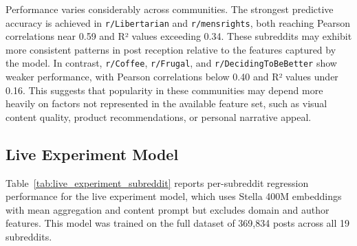 Performance varies considerably across communities. The strongest predictive accuracy is achieved in \verb!r/Libertarian! and \verb!r/mensrights!, both reaching Pearson correlations near 0.59 and R² values exceeding 0.34. These subreddits may exhibit more consistent patterns in post reception relative to the features captured by the model. In contrast, \verb!r/Coffee!, \verb!r/Frugal!, and \verb!r/DecidingToBeBetter! show weaker performance, with Pearson correlations below 0.40 and R² values under 0.16. This suggests that popularity in these communities may depend more heavily on factors not represented in the available feature set, such as visual content quality, product recommendations, or personal narrative appeal.

\subsection{Live Experiment Model}

Table~\ref{tab:live_experiment_subreddit} reports per-subreddit regression performance for the live experiment model, which uses Stella 400M embeddings with mean aggregation and content prompt but excludes domain and author features. This model was trained on the full dataset of 369,834 posts across all 19 subreddits.

